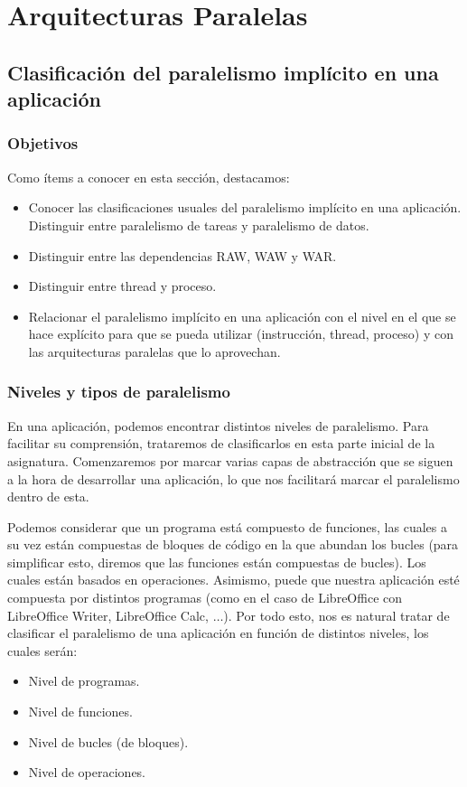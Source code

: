 \chapter{Arquitecturas Paralelas}

\section{Clasificación del paralelismo implícito en una aplicación}
\subsection{Objetivos}
Como ítems a conocer en esta sección, destacamos:
\begin{itemize}
    \item Conocer las clasificaciones usuales del paralelismo implícito en una aplicación. Distinguir entre paralelismo de tareas y paralelismo de datos.
    \item Distinguir entre las dependencias RAW, WAW y WAR.
    \item Distinguir entre thread y proceso.
    \item Relacionar el paralelismo implícito en una aplicación con el nivel en el que se hace explícito para que se pueda utilizar (instrucción, thread, proceso) y con las arquitecturas paralelas que lo aprovechan.
\end{itemize}

\subsection{Niveles y tipos de paralelismo}
En una aplicación, podemos encontrar distintos niveles de paralelismo. Para facilitar su comprensión, trataremos de clasificarlos en esta parte inicial de la asignatura. Comenzaremos por marcar varias capas de abstracción que se siguen a la hora de desarrollar una aplicación, lo que nos facilitará marcar el paralelismo dentro de esta.

Podemos considerar que un programa está compuesto de funciones, las cuales a su vez están compuestas de bloques de código en la que abundan los bucles (para simplificar esto, diremos que las funciones están compuestas de bucles). Los cuales están basados en operaciones. Asimismo, puede que nuestra aplicación esté compuesta por distintos programas (como en el caso de LibreOffice con LibreOffice Writer, LibreOffice Calc, $\ldots$). Por todo esto, nos es natural tratar de clasificar el paralelismo de una aplicación en función de distintos niveles, los cuales serán:
\begin{itemize}
    \item Nivel de programas.
    \item Nivel de funciones.
    \item Nivel de bucles (de bloques).
    \item Nivel de operaciones.
\end{itemize}

